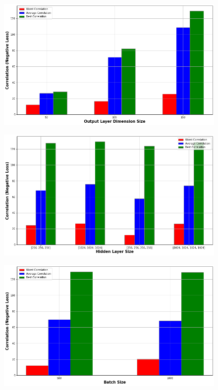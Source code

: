 {\section{}
\begin{figure}[H]
    \centering
    \includegraphics[width=\textwidth]{figures/DCCA_optimizations/MCA_Outdim.png}
    \caption{}
\end{figure}
\begin{figure}[H]
    \centering
    \includegraphics[width=\textwidth]{figures/DCCA_optimizations/MCA_Hidden.png}
    \caption{}
\end{figure}
\begin{figure}[H]
    \centering
    \includegraphics[width=\textwidth]{figures/DCCA_optimizations/MCA_Batch.png}

\end{figure}}
